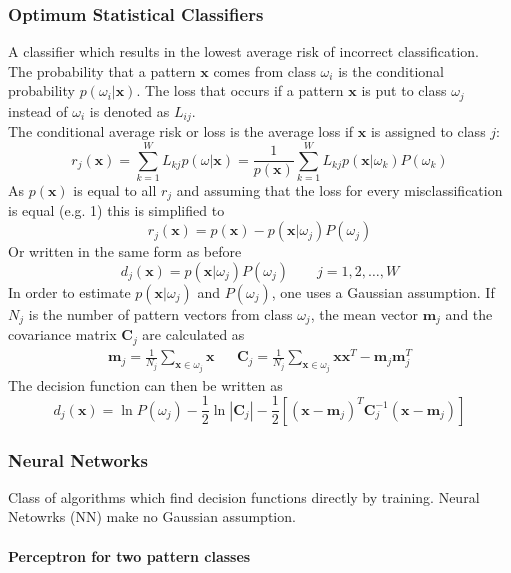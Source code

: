 \subsubsection{Optimum Statistical Classifiers}
A classifier which results in the lowest average risk of incorrect classification. \\

The probability that a pattern $\mathbf{x}$ comes from class $\omega_i$ is the conditional probability $p(\omega_i | \mathbf{x})$.
The loss that occurs if a pattern $\mathbf{x}$ is put to class $\omega_j$ instead of $\omega_i$ is denoted as $L_{ij}$. \\

The conditional average risk or loss is the average loss if $\mathbf{x}$ is assigned to class $j$:
	\[
		r_j(\mathbf{x}) = \sum\limits_{k=1}^{W} L_{kj} p(\omega | \mathbf{x}) = \frac{1}{p(\mathbf{x})} \sum\limits_{k=1}^{W} L_{kj} p(\mathbf{x} | \omega_k) P(\omega_k)
	\]
As $p(\mathbf{x})$ is equal to all $r_j$ and assuming that the loss for every misclassification is equal (e.g. 1) this is simplified to
	\[
		r_j(\mathbf{x}) = p(\mathbf{x}) - p(\mathbf{x} | \omega_j) P(\omega_j)
	\]
Or written in the same form as before
	\[
		d_j(\mathbf{x}) = p(\mathbf{x} | \omega_j) P(\omega_j)	\qquad j=1,2,\ldots,W
	\]
In order to estimate $p(\mathbf{x}|\omega_j)$ and $P(\omega_j)$, one uses a Gaussian assumption. 
If $N_j$ is the number of pattern vectors from class $\omega_j$, the mean vector $\mathbf{m}_j$ and the covariance matrix $\mathbf{C}_j$ are calculated as
\begin{align*}
	\mathbf{m}_j = \frac{1}{N_j} \sum\limits_{\mathbf{x}\in\omega_j} \mathbf{x}
	&&
	\mathbf{C}_j = \frac{1}{N_j} \sum\limits_{\mathbf{x}\in\omega_j} \mathbf{x}\mathbf{x}^T - \mathbf{m}_j\mathbf{m}_j^T
\end{align*}
The decision function can then be written as
	\[
		d_j(\mathbf{x}) = \ln P(\omega_j) - \frac{1}{2}\ln|\mathbf{C}_j| - \frac{1}{2}\left[(\mathbf{x}-\mathbf{m}_j)^T\mathbf{C}_j^{-1}(\mathbf{x}-\mathbf{m}_j)\right]
	\]

\subsubsection{Neural Networks}

Class of algorithms which find decision functions directly by training. Neural Netowrks (NN) make no Gaussian assumption.

\paragraph{Perceptron for two pattern classes}

